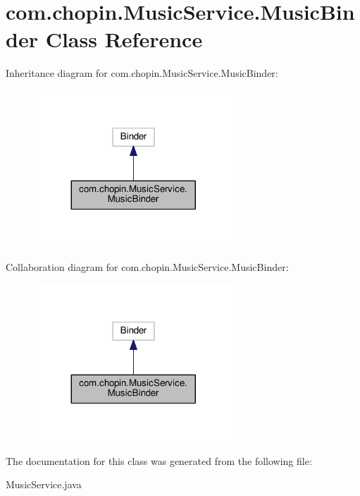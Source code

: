 \hypertarget{classcom_1_1chopin_1_1MusicService_1_1MusicBinder}{}\section{com.\+chopin.\+Music\+Service.\+Music\+Binder Class Reference}
\label{classcom_1_1chopin_1_1MusicService_1_1MusicBinder}


Inheritance diagram for com.\+chopin.\+Music\+Service.\+Music\+Binder\+:\nopagebreak
\begin{figure}[H]
\begin{center}
\leavevmode
\includegraphics[width=212pt]{classcom_1_1chopin_1_1MusicService_1_1MusicBinder__inherit__graph}
\end{center}
\end{figure}


Collaboration diagram for com.\+chopin.\+Music\+Service.\+Music\+Binder\+:\nopagebreak
\begin{figure}[H]
\begin{center}
\leavevmode
\includegraphics[width=212pt]{classcom_1_1chopin_1_1MusicService_1_1MusicBinder__coll__graph}
\end{center}
\end{figure}


The documentation for this class was generated from the following file\+:\begin{DoxyCompactItemize}
\item 
Music\+Service.\+java\end{DoxyCompactItemize}
